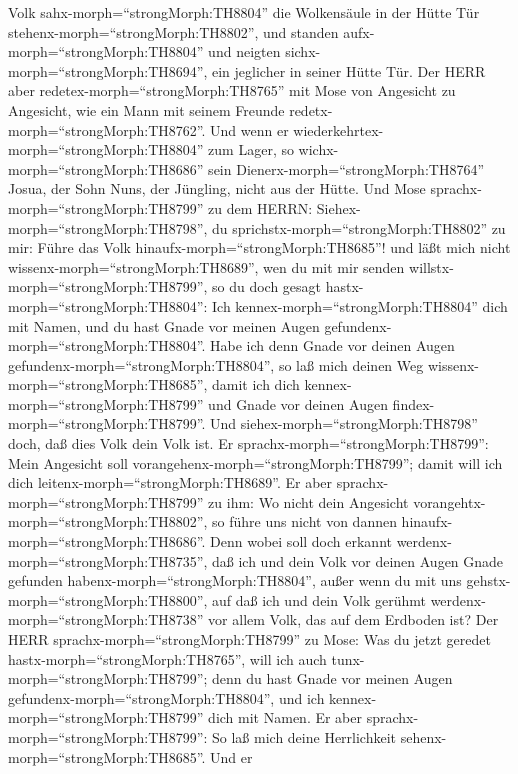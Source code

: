 Volk sahx-morph=``strongMorph:TH8804'' die Wolkensäule in der Hütte Tür
stehenx-morph=``strongMorph:TH8802'', und standen
aufx-morph=``strongMorph:TH8804'' und neigten
sichx-morph=``strongMorph:TH8694'', ein jeglicher in seiner Hütte Tür.
 Der HERR aber redetex-morph=``strongMorph:TH8765'' mit
Mose von Angesicht zu Angesicht, wie ein Mann mit seinem Freunde
redetx-morph=``strongMorph:TH8762''. Und wenn er
wiederkehrtex-morph=``strongMorph:TH8804'' zum Lager, so
wichx-morph=``strongMorph:TH8686'' sein
Dienerx-morph=``strongMorph:TH8764'' Josua, der Sohn Nuns, der Jüngling,
nicht aus der Hütte.  Und Mose
sprachx-morph=``strongMorph:TH8799'' zu dem HERRN:
Siehex-morph=``strongMorph:TH8798'', du
sprichstx-morph=``strongMorph:TH8802'' zu mir: Führe das Volk
hinaufx-morph=``strongMorph:TH8685''! und läßt mich nicht
wissenx-morph=``strongMorph:TH8689'', wen du mit mir senden
willstx-morph=``strongMorph:TH8799'', so du doch gesagt
hastx-morph=``strongMorph:TH8804'': Ich
kennex-morph=``strongMorph:TH8804'' dich mit Namen, und du hast Gnade
vor meinen Augen gefundenx-morph=``strongMorph:TH8804''. 
Habe ich denn Gnade vor deinen Augen
gefundenx-morph=``strongMorph:TH8804'', so laß mich deinen Weg
wissenx-morph=``strongMorph:TH8685'', damit ich dich
kennex-morph=``strongMorph:TH8799'' und Gnade vor deinen Augen
findex-morph=``strongMorph:TH8799''. Und
siehex-morph=``strongMorph:TH8798'' doch, daß dies Volk dein Volk ist.
 Er sprachx-morph=``strongMorph:TH8799'': Mein Angesicht
soll vorangehenx-morph=``strongMorph:TH8799''; damit will ich dich
leitenx-morph=``strongMorph:TH8689''.  Er aber
sprachx-morph=``strongMorph:TH8799'' zu ihm: Wo nicht dein Angesicht
vorangehtx-morph=``strongMorph:TH8802'', so führe uns nicht von dannen
hinaufx-morph=``strongMorph:TH8686''.  Denn wobei soll doch
erkannt werdenx-morph=``strongMorph:TH8735'', daß ich und dein Volk vor
deinen Augen Gnade gefunden habenx-morph=``strongMorph:TH8804'', außer
wenn du mit uns gehstx-morph=``strongMorph:TH8800'', auf daß ich und
dein Volk gerühmt werdenx-morph=``strongMorph:TH8738'' vor allem Volk,
das auf dem Erdboden ist?  Der HERR
sprachx-morph=``strongMorph:TH8799'' zu Mose: Was du jetzt geredet
hastx-morph=``strongMorph:TH8765'', will ich auch
tunx-morph=``strongMorph:TH8799''; denn du hast Gnade vor meinen Augen
gefundenx-morph=``strongMorph:TH8804'', und ich
kennex-morph=``strongMorph:TH8799'' dich mit Namen.  Er
aber sprachx-morph=``strongMorph:TH8799'': So laß mich deine
Herrlichkeit sehenx-morph=``strongMorph:TH8685''.  Und er
